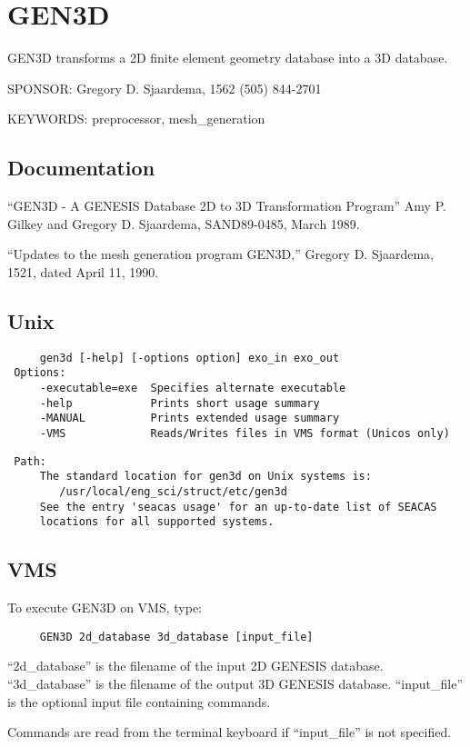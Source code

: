 
\section{GEN3D}
GEN3D transforms a 2D finite element geometry database into a 3D database.

SPONSOR:  Gregory D. Sjaardema, 1562 (505) 844-2701

KEYWORDS: preprocessor, mesh\_generation
\subsection{Documentation  }
``GEN3D - A GENESIS Database 2D to 3D Transformation Program''
Amy P. Gilkey and Gregory D. Sjaardema, SAND89-0485, 
March 1989.

``Updates to the mesh generation program GEN3D,''
Gregory D. Sjaardema, 1521, dated April 11, 1990.

\subsection{Unix}
\begin{verbatim}
     gen3d [-help] [-options option] exo_in exo_out
 Options:
     -executable=exe  Specifies alternate executable
     -help            Prints short usage summary
     -MANUAL          Prints extended usage summary
     -VMS             Reads/Writes files in VMS format (Unicos only)
\end{verbatim}
\begin{verbatim}
 Path:
     The standard location for gen3d on Unix systems is:
        /usr/local/eng_sci/struct/etc/gen3d
     See the entry 'seacas usage' for an up-to-date list of SEACAS
     locations for all supported systems.
\end{verbatim}
\subsection{VMS}
To execute GEN3D on VMS, type:

\begin{verbatim}
     GEN3D 2d_database 3d_database [input_file]
\end{verbatim}

``2d\_database'' is the filename of the input  2D GENESIS database.
``3d\_database'' is the filename of the output 3D GENESIS database.
``input\_file''  is the optional input file containing commands.

Commands are read from the terminal keyboard if ``input\_file''
is not specified. 

